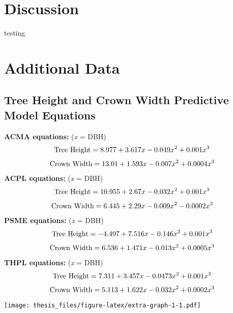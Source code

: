 \documentclass[12pt,twoside]{reedthesis}
\begin{document}
\hypertarget{discussion}{%
\chapter{Discussion}\label{discussion}}

testing

\appendix

\hypertarget{data}{%
\chapter{Additional Data}\label{data}}

\hypertarget{tree-model-eqs}{%
\section{Tree Height and Crown Width Predictive Model Equations}\label{tree-model-eqs}}

\textbf{ACMA equations:} (\textit{x} = DBH)
\begin{equation}
\textrm{Tree Height} = 8.977 + 3.617x -0.049x^{2} + 0.001x^{3}  \\
\end{equation}
\begin{equation}
\textrm{Crown Width} = 13.01 + 1.593x - 0.007x^{2} + 0.0004x^{3} \\
\end{equation}
\textbf{ACPL equations:} (\textit{x} = DBH)
\begin{equation}
\textrm{Tree Height} = 10.955+ 2.67x -0.032x^2 + 0.001x^3  \\
\end{equation}
\begin{equation}
\textrm{Crown Width} = 6.445 + 2.29x - 0.009x^2 - 0.0002x^3 \\
\end{equation}
\textbf{PSME equations:} (\textit{x} = DBH)
\begin{equation}
\textrm{Tree Height} = -4.497 + 7.516x - 0.146x^2 + 0.001x^3 \\
\end{equation}
\begin{equation}
\textrm{Crown Width} = 6.536 + 1.471x - 0.013x^2 + 0.0005x^3 \\
\end{equation}
\textbf{THPL equations:} (\textit{x} = DBH)
\begin{equation}
\textrm{Tree Height} = 7.311 + 3.457x - 0.0473x^2 + 0.001x^3 \\
\end{equation}
\begin{equation}
\textrm{Crown Width} = 5.113 + 1.622x - 0.032x^2 + 0.0002x^3 \\
\end{equation}
\texttt{[image: thesis\_files/figure-latex/extra-graph-1-1.pdf]}
\end{document}

